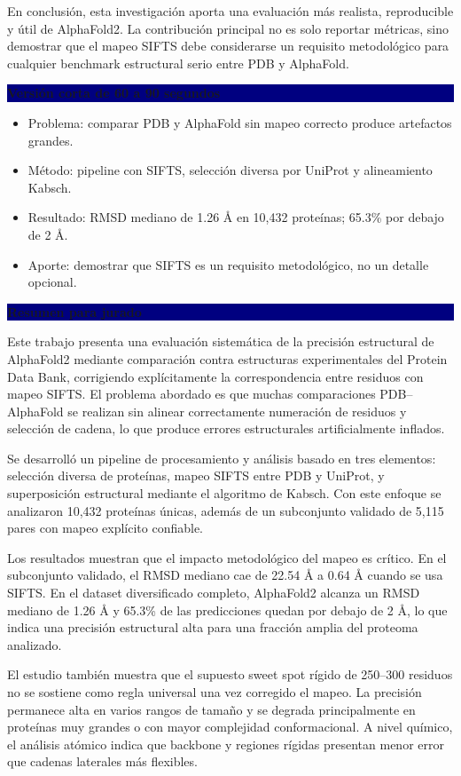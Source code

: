 \documentclass[12pt]{extarticle}
\newcommand{\Ang}{\AA}
\newcommand{\sectionbar}[1]{%
  \vspace{0.8em}
  \noindent\colorbox{navy}{\parbox{\dimexpr\linewidth-2\fboxsep\relax}{\color{white}\bfseries #1}}
  \vspace{0.5em}
}
\begin{document}
En conclusión, esta investigación aporta una evaluación más realista, reproducible y útil de AlphaFold2. La contribución principal no es solo reportar métricas, sino demostrar que el mapeo SIFTS debe considerarse un requisito metodológico para cualquier benchmark estructural serio entre PDB y AlphaFold.

\sectionbar{Versión corta de 60 a 90 segundos}
\begin{itemize}
  \item Problema: comparar PDB y AlphaFold sin mapeo correcto produce artefactos grandes.
  \item Método: pipeline con SIFTS, selección diversa por UniProt y alineamiento Kabsch.
  \item Resultado: RMSD mediano de 1.26 \Ang{} en 10,432 proteínas; 65.3\% por debajo de 2 \Ang.
  \item Aporte: demostrar que SIFTS es un requisito metodológico, no un detalle opcional.
\end{itemize}

\sectionbar{Resumen para jurado}
Este trabajo presenta una evaluación sistemática de la precisión estructural de AlphaFold2 mediante comparación contra estructuras experimentales del Protein Data Bank, corrigiendo explícitamente la correspondencia entre residuos con mapeo SIFTS. El problema abordado es que muchas comparaciones PDB--AlphaFold se realizan sin alinear correctamente numeración de residuos y selección de cadena, lo que produce errores estructurales artificialmente inflados.

Se desarrolló un pipeline de procesamiento y análisis basado en tres elementos: selección diversa de proteínas, mapeo SIFTS entre PDB y UniProt, y superposición estructural mediante el algoritmo de Kabsch. Con este enfoque se analizaron 10,432 proteínas únicas, además de un subconjunto validado de 5,115 pares con mapeo explícito confiable.

Los resultados muestran que el impacto metodológico del mapeo es crítico. En el subconjunto validado, el RMSD mediano cae de 22.54 \Ang{} a 0.64 \Ang{} cuando se usa SIFTS. En el dataset diversificado completo, AlphaFold2 alcanza un RMSD mediano de 1.26 \Ang{} y 65.3\% de las predicciones quedan por debajo de 2 \Ang{}, lo que indica una precisión estructural alta para una fracción amplia del proteoma analizado.

El estudio también muestra que el supuesto sweet spot rígido de 250--300 residuos no se sostiene como regla universal una vez corregido el mapeo. La precisión permanece alta en varios rangos de tamaño y se degrada principalmente en proteínas muy grandes o con mayor complejidad conformacional. A nivel químico, el análisis atómico indica que backbone y regiones rígidas presentan menor error que cadenas laterales más flexibles.
\end{document}
